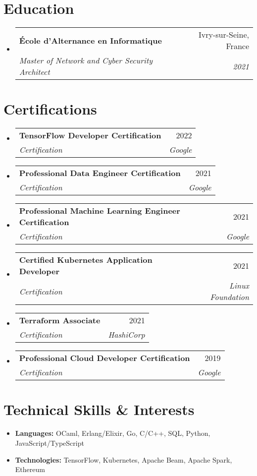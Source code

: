 \documentclass[letterpaper,11pt]{article}
\makeatletter
\newcommand{\resumeItem}[1]{
  \item\small{#1 \vspace{-2pt}}
}
\newcommand{\resumeSubheading}[4]{
  \vspace{-1pt}\item
    \begin{tabular*}{0.97\textwidth}[t]{l@{\extracolsep{\fill}}r}
      \textbf{#1} & #2 \\
      \textit{\small#3} & \textit{\small #4} \\
    \end{tabular*}\vspace{-5pt}
}
\newcommand{\resumeSubHeadingListStart}{\begin{itemize}[leftmargin=*]}
\newcommand{\resumeSubHeadingListEnd}{\end{itemize}}
\makeatother
\begin{document}
\section{Education}
\resumeSubHeadingListStart{}
\resumeSubheading{École d'Alternance en Informatique}
{Ivry-sur-Seine, France}
{Master of Network and Cyber Security Architect}
{2021}
\resumeSubHeadingListEnd{}


\section{Certifications}
\resumeSubHeadingListStart{}
\resumeSubheading{TensorFlow Developer Certification}
{2022}
{Certification}
{Google}
\resumeSubheading{Professional Data Engineer Certification}
{2021}
{Certification}
{Google}
\resumeSubheading{Professional Machine Learning Engineer Certification}
{2021}
{Certification}
{Google}
\resumeSubheading{Certified Kubernetes Application Developer}
{2021}
{Certification}
{Linux Foundation}
\resumeSubheading{Terraform Associate}
{2021}
{Certification}
{HashiCorp}
\resumeSubheading{Professional Cloud Developer Certification}
{2019}
{Certification}
{Google}
\resumeSubHeadingListEnd{}

\section{Technical Skills \& Interests}
\resumeSubHeadingListStart{}
\resumeItem{
  \textbf{Languages:}{
    OCaml, Erlang/Elixir, Go, C/C++, SQL, Python, JavaScript/TypeScript
  }
}
\resumeItem{
  \textbf{Technologies:}{
    TensorFlow, Kubernetes, Apache Beam, Apache Spark, Ethereum
  }
}
\resumeSubHeadingListEnd{}
\end{document}
